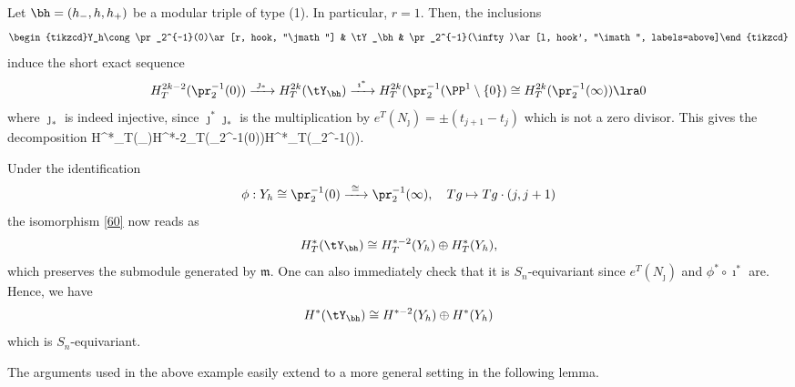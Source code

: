\begin{example}[$r=1$]
	Let $\bh=(h_-,h,h_+)$ be a modular triple of type (1). In particular, $r=1$. Then, the inclusions
	\[\begin{tikzcd}Y_h\cong \pr_2^{-1}(0)\ar[r, hook, "\jmath"] & \tY_\bh & \pr_2^{-1}(\infty)\ar[l, hook', "\imath", labels=above]\end{tikzcd}\]
	induce the short exact sequence
	\[H_T^{2k-2}(\pr_2^{-1}(0))\xrightarrow{~\jmath_*~} H_T^{2k}(\tY_\bh)\xrightarrow{~\imath^*~} H^{2k}_T(\pr_2^{-1}(\PP^1\setminus\{0\})\cong H_T^{2k}(\pr_2^{-1}(\infty))\lra 0\]
	where $\jmath_*$ is indeed injective, since $\jmath^*\jmath_*$ is the multiplication by $e^T(N_\jmath)=\pm (t_{j+1}-t_j)$ which is not a zero divisor. 
	This gives the decomposition
	\beq \label{60} H^*_T(\tY_\bh)\cong  H^{*-2}_T(\pr_2^{-1}(0))\oplus H^*_T(\pr_2^{-1}(\infty)).\eeq 


	Under the identification 
	\[\phi: Y_h\cong \pr_2^{-1}(0)\xrightarrow{~\cong~}\pr_2^{-1}(\infty), \quad Tg\mapsto Tg\cdot (j,j+1)\] 
	the isomorphism \eqref{60} now reads as 
	\[H^*_T(\tY_\bh)\cong H^{*-2}_T(Y_h)\oplus H^*_T(Y_h),\]
	which preserves the submodule generated by $\mathfrak{m}$. One can also immediately check that it is $S_n$-equivariant since $e^T(N_\jmath)$ and $\phi^*\circ \imath^*$ are. 
	Hence, we have
	\[H^*(\tY_\bh)\cong H^{*-2}(Y_h)\oplus H^*(Y_h)\]
	which is $S_n$-equivariant.
	\end{example}
	The arguments used in the above example easily extend to a more general setting in the following lemma.
























